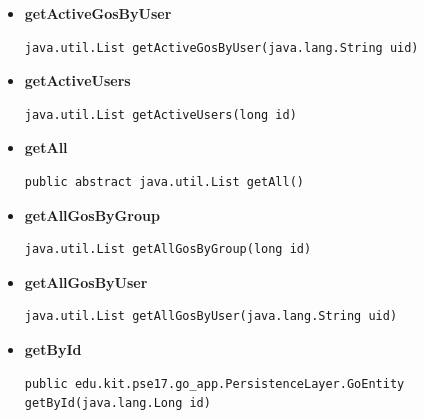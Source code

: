 \documentclass[11pt,a4paper]{report}
\begin{document}
{{{{{{{{{{{{\begin{itemize}
{\begin{lstlisting}[frame=none]
java.util.List getActiveGosByGroup(long id)\end{lstlisting} %
}%
\item{ 
\hypertarget{edu.kit.pse17.go_app.PersistenceLayer.daos.GoDaoImp.getActiveGosByUser(java.lang.String)}{{\bf  getActiveGosByUser}\\}
\begin{lstlisting}[frame=none]
java.util.List getActiveGosByUser(java.lang.String uid)\end{lstlisting} %
}%
\item{ 
\hypertarget{edu.kit.pse17.go_app.PersistenceLayer.daos.GoDaoImp.getActiveUsers(long)}{{\bf  getActiveUsers}\\}
\begin{lstlisting}[frame=none]
java.util.List getActiveUsers(long id)\end{lstlisting} %
}%
\item{ 
\hypertarget{edu.kit.pse17.go_app.PersistenceLayer.daos.GoDaoImp.getAll()}{{\bf  getAll}\\}
\begin{lstlisting}[frame=none]
public abstract java.util.List getAll()\end{lstlisting} %
}%
\item{ 
\hypertarget{edu.kit.pse17.go_app.PersistenceLayer.daos.GoDaoImp.getAllGosByGroup(long)}{{\bf  getAllGosByGroup}\\}
\begin{lstlisting}[frame=none]
java.util.List getAllGosByGroup(long id)\end{lstlisting} %
}%
\item{ 
\hypertarget{edu.kit.pse17.go_app.PersistenceLayer.daos.GoDaoImp.getAllGosByUser(java.lang.String)}{{\bf  getAllGosByUser}\\}
\begin{lstlisting}[frame=none]
java.util.List getAllGosByUser(java.lang.String uid)\end{lstlisting} %
}%
\item{ 
\hypertarget{edu.kit.pse17.go_app.PersistenceLayer.daos.GoDaoImp.getById(java.lang.Long)}{{\bf  getById}\\}
\begin{lstlisting}[frame=none]
public edu.kit.pse17.go_app.PersistenceLayer.GoEntity getById(java.lang.Long id)\end{lstlisting} %
}
\end{itemize}}}}}}}}}}}}}
\end{document}
